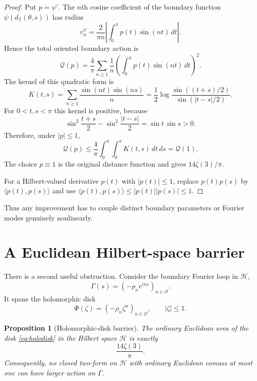 \documentclass[11pt]{article}
\newtheorem{proposition}[theorem]{Proposition}
\newcommand{\T}{\mathbb T}
\begin{document}
\begin{proof}
Put $p=\psi'$.  The $n$th cosine coefficient of the boundary function
$\psi(d_{\T}(\theta,s))$ has radius
\[
 r_n^\psi
 =
 \frac{2}{\pi n}
 \left|
 \int_0^\pi p(t)\sin(nt)\,dt
 \right|.
\]
Hence the total oriented boundary action is
\begin{equation}\label{eq:Qp}
 \mathcal Q(p)
 =
 \frac4\pi\sum_{n\ge1}\frac1n
 \left(
 \int_0^\pi p(t)\sin(nt)\,dt
 \right)^2.
\end{equation}
The kernel of this quadratic form is
\begin{equation}\label{eq:positive-kernel}
 K(t,s)
 =
 \sum_{n\ge1}\frac{\sin(nt)\sin(ns)}{n}
 =
 \frac12\log
 \frac{\sin((t+s)/2)}
      {\sin(|t-s|/2)}.
\end{equation}
For $0<t,s<\pi$ this kernel is positive, because
\[
 \sin^2\frac{t+s}{2}
 -
 \sin^2\frac{|t-s|}{2}
 =
 \sin t\,\sin s>0.
\]
Therefore, under $|p|\le1$,
\[
 \mathcal Q(p)
 \le
 \frac4\pi\int_0^\pi\int_0^\pi K(t,s)\,dt\,ds
 =
 \mathcal Q(1).
\]
The choice $p\equiv1$ is the original distance function and gives
$14\zeta(3)/\pi$.

For a Hilbert-valued derivative $p(t)$ with $|p(t)|\le1$, replace
$p(t)p(s)$ by $\langle p(t),p(s)\rangle$ and use
$\langle p(t),p(s)\rangle\le|p(t)||p(s)|\le1$.
\end{proof}

Thus any improvement has to couple distinct boundary parameters or Fourier
modes genuinely nonlinearly.

\section{A Euclidean Hilbert-space barrier}

There is a second useful obstruction.  Consider the boundary Fourier loop
in $\mathcal H$,
\[
        \Gamma(s)=(-\rho_ne^{ins})_{n\in\mathcal O}.
\]
It spans the holomorphic disk
\begin{equation}\label{eq:holodisk}
        \Phi(\zeta)=(-\rho_n\zeta^n)_{n\in\mathcal O},
        \qquad|\zeta|\le1.
\end{equation}

\begin{proposition}[Holomorphic-disk barrier]\label{prop:holodisk}
The ordinary Euclidean area of the disk \eqref{eq:holodisk} in the Hilbert
space $\mathcal H$ is exactly
\[
        \frac{14\zeta(3)}{\pi}.
\]
Consequently, no closed two-form on $\mathcal H$ with ordinary Euclidean
comass at most one can have larger action on $\Gamma$.
\end{proposition}
\end{document}

